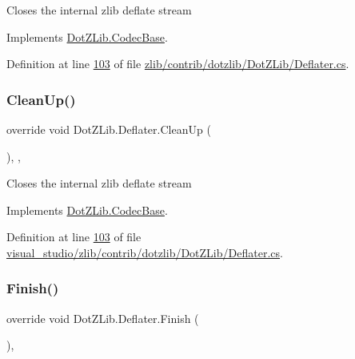 Closes the internal zlib deflate stream 



Implements \hyperlink{class_dot_z_lib_1_1_codec_base_aa0ded075105c5cf6f5f0d61928c90ca6}{Dot\+Z\+Lib.\+Codec\+Base}.



Definition at line \hyperlink{zlib_2contrib_2dotzlib_2_dot_z_lib_2_deflater_8cs_source_l00103}{103} of file \hyperlink{zlib_2contrib_2dotzlib_2_dot_z_lib_2_deflater_8cs_source}{zlib/contrib/dotzlib/\+Dot\+Z\+Lib/\+Deflater.\+cs}.

\mbox{\label{class_dot_z_lib_1_1_deflater_af06ac29d92dbe5d6198b8fa906476e05}} 
\subsubsection{\texorpdfstring{Clean\+Up()}{CleanUp()}\hspace{0.1cm}{\footnotesize\ttfamily [2/2]}}
{\footnotesize\ttfamily override void Dot\+Z\+Lib.\+Deflater.\+Clean\+Up (\begin{DoxyParamCaption}{ }\end{DoxyParamCaption})\hspace{0.3cm}{\ttfamily [inline]}, {\ttfamily [protected]}, {\ttfamily [virtual]}}



Closes the internal zlib deflate stream 



Implements \hyperlink{class_dot_z_lib_1_1_codec_base_aa0ded075105c5cf6f5f0d61928c90ca6}{Dot\+Z\+Lib.\+Codec\+Base}.



Definition at line \hyperlink{visual__studio_2zlib_2contrib_2dotzlib_2_dot_z_lib_2_deflater_8cs_source_l00103}{103} of file \hyperlink{visual__studio_2zlib_2contrib_2dotzlib_2_dot_z_lib_2_deflater_8cs_source}{visual\+\_\+studio/zlib/contrib/dotzlib/\+Dot\+Z\+Lib/\+Deflater.\+cs}.

\mbox{\label{class_dot_z_lib_1_1_deflater_a84507769a20a13c2ff48cfcef8f5c13b}} 
\subsubsection{\texorpdfstring{Finish()}{Finish()}\hspace{0.1cm}{\footnotesize\ttfamily [1/2]}}
{\footnotesize\ttfamily override void Dot\+Z\+Lib.\+Deflater.\+Finish (\begin{DoxyParamCaption}{ }\end{DoxyParamCaption})\hspace{0.3cm}{\ttfamily [inline]}, {\ttfamily [virtual]}}



